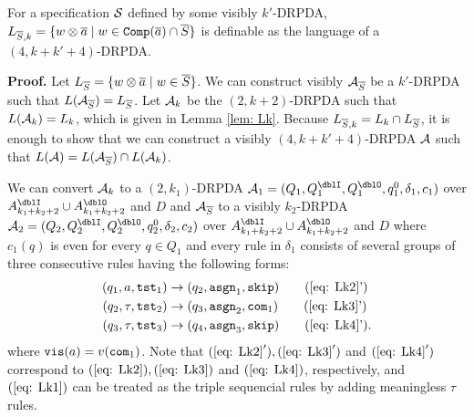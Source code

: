 \begin{lemma}\label{lem: LkS}
For a specification ${\cal S}$ defined by some visibly $k'$-DRPDA,
$L_{{\overline{S}}, k} = \{w\otimes{\overline{a}} \mid w\in{\mathtt{Comp}}({\overline{a}})\cap {\overline{S}}\}$
is definable as the language of a $(4,k+k'+4)$-DRPDA.
\end{lemma}
{\bf Proof.}\quad
Let $L_{{\overline{S}}} = \{w\otimes{\overline{a}}\mid w\in{\overline{S}}\}$.
We can construct visibly ${\cal A}_{{\overline{S}}}$ be a $k'$-DRPDA such that $L({\cal A}_{{\overline{S}}})= L_{{\overline{S}}}$.
Let ${\cal A}_k$ be the $(2,k+2)$-DRPDA
such that $L({\cal A}_k)=L_k$, which is given in Lemma \ref{lem: Lk}.
Because $L_{{\overline{S}}, k} = L_k \cap L_{{\overline{S}}}$, it is enough to show that we can construct a visibly $(4,k+k'+4)$-DRPDA ${\cal A}$ such that $L({\cal A})=L({\cal A}_{{\overline{S}}})\cap L({\cal A}_k)$.

We can convert ${\cal A}_k$ to a $(2,k_1)$-DRPDA $\calA_1=(Q_1, Q^\dblI_1, Q^\dblO_1, q^0_1, \delta_1, c_1)$
over $A^\dblI_{k_1+k_2+2}\cup A^\dblO_{k_1+k_2+2}$ and $D$
and ${\cal A}_{{\overline{S}}}$ to a visibly $k_2$-DRPDA $\calA_2=(Q_2, Q^\dblI_2, Q^\dblO_2, q^0_2, \delta_2, c_2)$
over $A^\dblI_{k_1+k_2+2}\cup A^\dblO_{k_1+k_2+2}$ and $D$
where
$c_1(q)$ is even for every $q\in Q_1$ and
every rule in $\delta_1$
consists of several groups of three consecutive rules having the following forms:
\begin{align}
(q_1, a, \tst_1) &\to (q_2,\asgn_1, \skip) \tag{\ref{eq: Lk2}'}\\
(q_2, \tau, \tst_2) &\to (q_3,\asgn_2, \com_1) \tag{\ref{eq: Lk3}'}\\
(q_3, \tau, \tst_3) &\to (q_4,\asgn_3, \skip) \tag{\ref{eq: Lk4}'}.
\end{align}
where $\mathtt{vis}(a)=v(\mathtt{com}_1)$.
Note that $(\ref{eq: Lk2}'), (\ref{eq: Lk3}')$ and $(\ref{eq: Lk4}')$ correspond to $(\ref{eq: Lk2}), (\ref{eq: Lk3})$ and $(\ref{eq: Lk4})$, respectively, and $(\ref{eq: Lk1})$ can be treated as the triple sequencial rules by adding meaningless $\tau$ rules.


